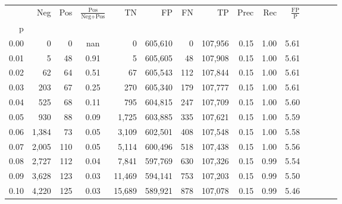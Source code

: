 \begin{tabular}{rrrcrrrrrrrrrrr}
\toprule
{} &     Neg &    Pos & $\frac{\text{Pos}}{\text{Neg}+\text{Pos}}$ &       TN &       FP &       FN &       TP &  Prec &   Rec & $\frac{\text{FP}}{\text{P}}$ \\
p    &         &        &                                            &          &          &          &          &       &       &                              \\
\midrule
0.00 &       0 &      0 &                                        nan &        0 &  605,610 &        0 &  107,956 &  0.15 &  1.00 &                         5.61 \\
0.01 &       5 &     48 &                                       0.91 &        5 &  605,605 &       48 &  107,908 &  0.15 &  1.00 &                         5.61 \\
0.02 &      62 &     64 &                                       0.51 &       67 &  605,543 &      112 &  107,844 &  0.15 &  1.00 &                         5.61 \\
0.03 &     203 &     67 &                                       0.25 &      270 &  605,340 &      179 &  107,777 &  0.15 &  1.00 &                         5.61 \\
0.04 &     525 &     68 &                                       0.11 &      795 &  604,815 &      247 &  107,709 &  0.15 &  1.00 &                         5.60 \\
0.05 &     930 &     88 &                                       0.09 &    1,725 &  603,885 &      335 &  107,621 &  0.15 &  1.00 &                         5.59 \\
0.06 &   1,384 &     73 &                                       0.05 &    3,109 &  602,501 &      408 &  107,548 &  0.15 &  1.00 &                         5.58 \\
0.07 &   2,005 &    110 &                                       0.05 &    5,114 &  600,496 &      518 &  107,438 &  0.15 &  1.00 &                         5.56 \\
0.08 &   2,727 &    112 &                                       0.04 &    7,841 &  597,769 &      630 &  107,326 &  0.15 &  0.99 &                         5.54 \\
0.09 &   3,628 &    123 &                                       0.03 &   11,469 &  594,141 &      753 &  107,203 &  0.15 &  0.99 &                         5.50 \\
0.10 &   4,220 &    125 &                                       0.03 &   15,689 &  589,921 &      878 &  107,078 &  0.15 &  0.99 &                         5.46 \\

\end{tabular}
